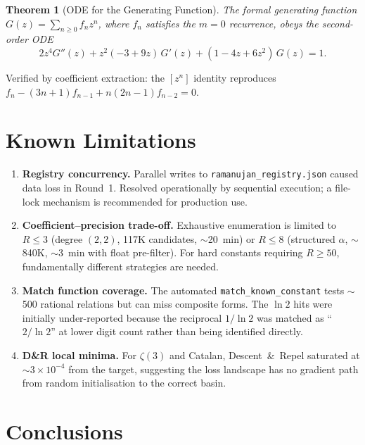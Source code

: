 \documentclass[11pt,a4paper]{article}
\newtheorem{theorem}{Theorem}
\begin{document}
\begin{theorem}[ODE for the Generating Function]
The formal generating function $G(z) = \sum_{n\ge 0} f_n z^n$, where
$f_n$ satisfies the $m = 0$ recurrence, obeys the second-order ODE
\[
2z^4 G''(z) + z^2(-3+9z)\,G'(z) + (1 - 4z + 6z^2)\,G(z) = 1.
\]
\end{theorem}
\noindent
Verified by coefficient extraction: the $[z^n]$ identity reproduces
$f_n - (3n+1)f_{n-1} + n(2n-1)f_{n-2} = 0$.

\section{Known Limitations}

\begin{enumerate}[leftmargin=2em]
\item \textbf{Registry concurrency.}  Parallel writes to
      \texttt{ramanujan\_registry.json} caused data loss in Round~1.
      Resolved operationally by sequential execution; a file-lock mechanism
      is recommended for production use.
\item \textbf{Coefficient--precision trade-off.}  Exhaustive enumeration is
      limited to $R \le 3$ (degree $(2,2)$, 117K candidates, $\sim$20~min)
      or $R \le 8$ (structured $\alpha$, $\sim$840K, $\sim$3~min with float
      pre-filter).  For hard constants requiring $R \ge 50$, fundamentally
      different strategies are needed.
\item \textbf{Match function coverage.}  The automated \texttt{match\_known\_constant}
      tests $\sim$500 rational relations but can miss composite forms.
      The $\ln 2$ hits were initially under-reported because the reciprocal
      $1/\ln 2$ was matched as ``$2/\ln 2$'' at lower digit count rather
      than being identified directly.
\item \textbf{D\&R local minima.}  For $\zeta(3)$ and Catalan,
      Descent~\&~Repel saturated at $\sim 3\times10^{-4}$ from the target,
      suggesting the loss landscape has no gradient path from random
      initialisation to the correct basin.
\end{enumerate}

\section{Conclusions}
\end{document}
